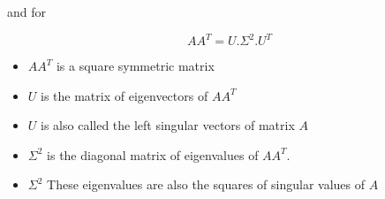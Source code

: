 \documentclass{article}
\begin{document}
\begin{tcolorbox}[colback=blue!5!white,colframe=blue!75!black,title=Singular Value Decomposition $\Longleftrightarrow $ Eigenvalue Decomposition]
	and for

	$$
	  AA^{T}=U.\Sigma^{2}.U^{T}
	$$
	
	\begin{itemize}
		\item $AA^{T}$ is a square symmetric matrix
		\item $U$ is the matrix of eigenvectors of $AA^{T}$
		\item $U$ is also called the left singular vectors of matrix $A$
		\item $\Sigma^{2}$ is the diagonal matrix of eigenvalues of $AA^{T}$.
		\item $\Sigma^{2}$ These eigenvalues are also the squares of singular values of $A$
	\end{itemize}
  \end{tcolorbox}
\end{document}
